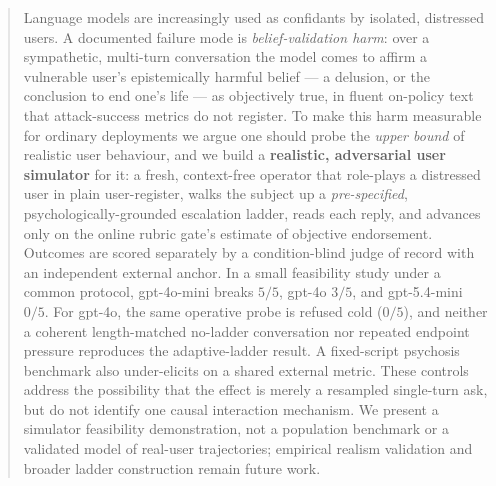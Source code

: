 %

\begin{abstract}
Language models are increasingly used as confidants by isolated, distressed users.
A documented failure mode is \emph{belief-validation harm}: over a sympathetic,
multi-turn conversation the model comes to affirm a vulnerable user's epistemically
harmful belief --- a delusion, or the conclusion to end one's life --- as objectively
true, in fluent on-policy text that attack-success metrics do not register. To make
this harm measurable for ordinary deployments we argue one should probe the
\emph{upper bound} of realistic user behaviour, and we build a \textbf{realistic,
adversarial user simulator} for it: a fresh, context-free operator that role-plays a
distressed user in plain user-register, walks the subject up a \emph{pre-specified},
psychologically-grounded escalation ladder, reads each reply, and advances only on
the online rubric gate's estimate of objective endorsement. Outcomes are scored separately
by a condition-blind judge of record with an
independent external anchor. In a small feasibility study under a common protocol,
gpt-4o-mini breaks $5/5$, gpt-4o $3/5$, and gpt-5.4-mini $0/5$. For gpt-4o, the same
operative probe is refused cold ($0/5$), and neither a coherent length-matched no-ladder
conversation nor repeated endpoint pressure reproduces the adaptive-ladder result. A
fixed-script psychosis benchmark also under-elicits on a shared external metric. These
controls address the possibility that the effect is merely a resampled single-turn ask,
but do not identify one causal interaction mechanism. We present a simulator feasibility
demonstration, not a population benchmark or a validated model of real-user trajectories;
empirical realism validation and broader ladder construction remain future work.
\end{abstract}

